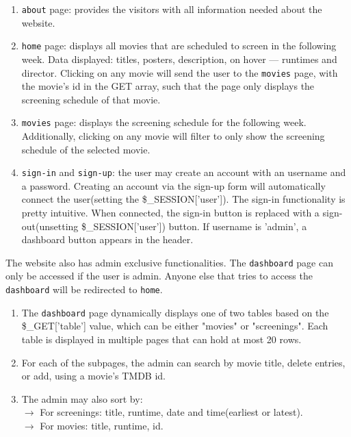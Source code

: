 \documentclass[a4paper]{article}
\begin{document}
\begin{enumerate}[label=$-$]
    \item\texttt{about} page: provides the visitors with all information needed about the website.
    
    \item\texttt{home} page: displays all movies that are scheduled to screen in the following week. Data displayed: titles, posters, description, on hover --- runtimes and director. Clicking on any movie will send the user to the \texttt{movies} page, with the movie's id in the GET array, such that the page only displays the screening schedule of that movie.

    \item\texttt{movies} page: displays the screening schedule for the following week. Additionally, clicking on any movie will filter to only show the screening schedule of the selected movie.

    \item\texttt{sign-in} and \texttt{sign-up}: the user may create an account with an username and a password. Creating an account via the sign-up form will automatically connect the user(setting the \$\_SESSION['user']). The sign-in functionality is pretty intuitive. When connected, the sign-in button is replaced with a sign-out(unsetting \$\_SESSION['user']) button. If username is 'admin', a dashboard button appears in the header.
\end{enumerate}

The website also has admin exclusive functionalities. The \texttt{dashboard} page can only be accessed if the user is admin. Anyone else that tries to access the \texttt{dashboard} will be redirected to \texttt{home}.

\begin{enumerate}[label=$-$]
    \item The \texttt{dashboard} page dynamically displays one of two tables based on the \$\_GET['table'] value, which can be either "movies" or "screenings". Each table is displayed in multiple pages that can hold at most 20 rows.
    \item For each of the subpages, the admin can search by movie title, delete entries, or add, using a movie's TMDB id.
    
    \item The admin may also sort by:\\$\rightarrow$ For screenings: title, runtime, date and time(earliest or latest).\\$\rightarrow$ For movies: title, runtime, id.
\end{enumerate}
\end{document}
